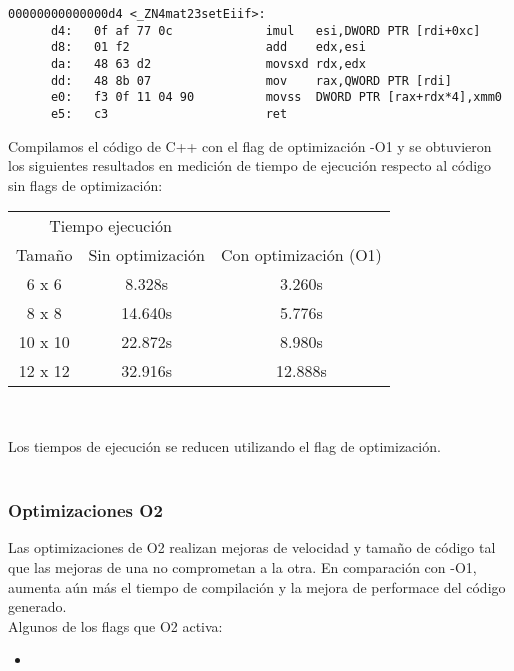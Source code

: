 \begin{verbatim}
00000000000000d4 <_ZN4mat23setEiif>:
      d4:	0f af 77 0c          	imul   esi,DWORD PTR [rdi+0xc]
      d8:	01 f2                	add    edx,esi
      da:	48 63 d2             	movsxd rdx,edx
      dd:	48 8b 07             	mov    rax,QWORD PTR [rdi]
      e0:	f3 0f 11 04 90       	movss  DWORD PTR [rax+rdx*4],xmm0
      e5:	c3                   	ret  
\end{verbatim}




Compilamos el código de C++ con el flag de optimización -O1 y se obtuvieron los siguientes resultados en medición de tiempo de ejecución respecto al código sin flags de optimización:\\

\begin{center}
	\begin{tabular}{ccc}  
		\toprule 
		\multicolumn{2}{c}{Tiempo ejecución} \\
		\cmidrule(r){1-3}
		Tamaño & Sin optimización & Con optimización (O1)  \\
		\midrule
		6 x 6   &	8.328s 	&	3.260s	\\
		8 x 8	&	14.640s	&	5.776s	\\
		10 x 10	&	22.872s	&	8.980s	\\
		12 x 12 &	32.916s &   12.888s \\
		\bottomrule
	\end{tabular}\\
\end{center}

Los tiempos de ejecución se reducen utilizando el flag de optimización.\\

~\\

\subsubsection{Optimizaciones O2}

Las optimizaciones de O2 realizan mejoras de velocidad y tamaño de código tal que las mejoras de una no comprometan a la otra. En comparación con -O1, aumenta aún más el tiempo de compilación y la mejora de performace del código generado.\\
Algunos de los flags que O2 activa:

\begin{itemize}
	\item 
\end{itemize}

